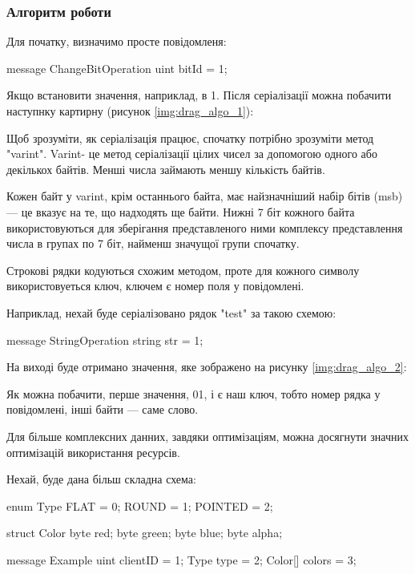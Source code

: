 \documentclass{lib/styles/default-style}
\begin{document}
    \subsubsection{Алгоритм роботи} 
    Для початку, визначимо просте повідомленя:

    \begin{snippet}
        message ChangeBitOperation {
            uint bitId = 1;
        }\end{snippet}
    
    Якщо встановити значення, наприклад, в 1.
    Після серіалізації можна побачити наступнку картирну (рисунок \ref{img:drag_algo_1}):


    Щоб зрозуміти, як серіалізація працює, спочатку потрібно зрозуміти метод "varint".
    Varint- це метод серіалізації цілих чисел за допомогою одного або декількох байтів.
    Менші числа займають меншу кількість байтів.

    Кожен байт у varint, крім останнього байта, має найзначніший набір бітів (msb) --- це вказує на те,
    що надходять ще байти. 
    Нижні 7 біт кожного байта використовуються для зберігання представленого ними комплексу
    представлення числа в групах по 7 біт, найменш значущої групи спочатку.
    
    Строкові рядки кодуються схожим методом, проте для кожного символу використовуеться ключ, ключем є номер поля у повідомлені.

    Наприклад, нехай буде серіалізовано рядок "test" за такою схемою:

    \begin{snippet}
        message StringOperation {
            string str = 1;
        }\end{snippet}
    
    На виході буде отримано значення, яке зображено на рисунку \ref{img:drag_algo_2}:


    Як можна побачити, перше значення, 01, і є наш ключ, тобто номер рядка у повідомлені, інші байти --- саме слово.
    
    Для більше комплексних данних, завдяки оптимізаціям, можна досягнути значних оптимізацій використання ресурсів.

    Нехай, буде дана більш складна схема:

    \begin{snippet}
        enum Type {
            FLAT = 0;
            ROUND = 1;
            POINTED = 2;
        }

        struct Color {
            byte red;
            byte green;
            byte blue;
            byte alpha;
        }

        message Example {
            uint clientID = 1;
            Type type = 2;
            Color[] colors = 3;
        }\end{snippet}
    
\end{document}

